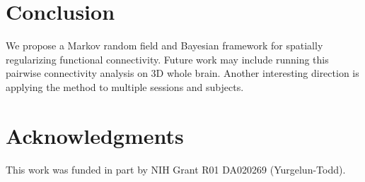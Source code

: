 \documentclass[runningheads,a4paper]{llncs}
\begin{document}
\section{Conclusion}
We propose a Markov random field and Bayesian framework for spatially regularizing functional connectivity. Future work may include running this pairwise connectivity analysis on 3D whole brain. Another interesting direction is applying the method to multiple sessions and subjects. 

\section{Acknowledgments}
This work was funded in part by NIH Grant R01 DA020269 (Yurgelun-Todd).

 

\end{document}
